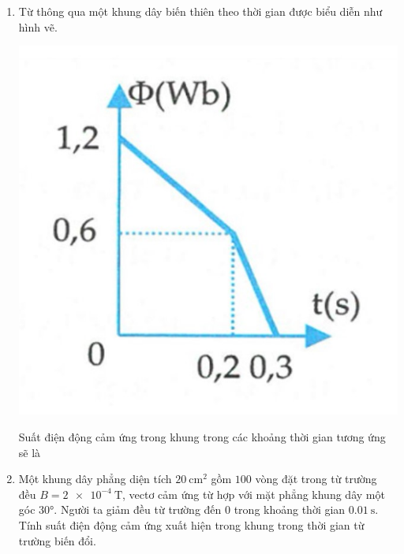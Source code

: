 \begin{enumerate}
{	
	}
	\item
	{
		Từ thông qua một khung dây biến thiên theo thời gian được biểu diễn như hình vẽ.
		\begin{center}
			\includegraphics[scale=0.4]{../figs/VN11-PH-29-P-0191-9}
		\end{center}
		Suất điện động cảm ứng trong khung trong các khoảng thời gian tương ứng sẽ là
	}
	\item
	{
		Một khung dây phẳng diện tích $\SI{20}{\centi \meter \squared}$ gồm $100$ vòng đặt trong từ trường đều $B=\SI{2e-4}{\tesla}$, vectơ cảm ứng từ hợp với mặt phẳng khung dây một góc $\ang{30}$. Người ta giảm đều từ trường đến $0$ trong khoảng thời gian $\SI{0.01}{\second}$. Tính suất điện động cảm ứng xuất hiện trong khung trong thời gian từ trường biến đổi.
}
\end{enumerate}
